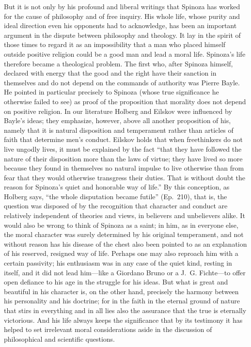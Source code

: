 \documentclass[12pt]{book}
\newcommand{\opage}[1]{\marginnote{\footnotesize\textit{[#1]}}}
\begin{document}
But it is not only by his profound and liberal writings that Spinoza has worked for
the cause of philosophy and of free inquiry. His whole life, whose purity and ideal
direction even his opponents had to acknowledge, has been an important argument in
the dispute between philosophy and theology. It lay in the spirit of those times to
regard it as an impossibility that a man who placed himself outside positive religion
could be a good man and lead a moral life. Spinoza's life therefore became a
theological problem. The first who, after Spinoza himself, declared with energy that
the good and the right have their sanction in themselves and do not depend on the
commands of authority was Pierre Bayle. He pointed in particular precisely to
\opage{41}Spinoza (whose true significance he otherwise failed to see) as proof of the
proposition that morality does not depend on positive religion. In our literature
Holberg and Eilskov were influenced by Bayle's ideas; they emphasize, however, above
all another proposition of his, namely that it is natural disposition and temperament
rather than articles of faith that determine men's conduct. Eilskov holds that when
freethinkers do not live ungodly lives, it must be explained by the fact ``that they
have followed the nature of their disposition more than the laws of virtue; they have
lived so more because they found in themselves no natural impulse to live otherwise
than from fear that they would otherwise transgress their duties. That is without
doubt the reason for Spinoza's quiet and honorable way of life.'' By this conception,
as Holberg says, ``the whole disputation became futile'' (Ep.~210), that is, the
question was disposed of by the recognition that character and conduct are relatively
independent of theories and views, in believers and unbelievers alike. It would also
be wrong to think of Spinoza as a saint; in him, as in everyone else, the moral
character was surely determined by his original temperament, and not without reason
has his disease of the chest also been pointed to as an explanation of his reserved,
resigned way of life. Perhaps one may also reproach him with a certain passivity; his
enthusiasm was in any case of the quiet kind, resting in itself, and it did not lead
him---like a Giordano Bruno or a J.~G. Fichte---to offer open defiance to his age in
the struggle for his ideas. But what is great and beautiful in his character is, on
the other \opage{42}hand, precisely the harmony between his personality and his
doctrine; for in the faith in the eternal ground of nature that stirs in everything and
in all lies also the assurance that the true is eternally victorious. And his life
always keeps the significance that by its testimony it has helped to set irrelevant
moral considerations aside in the discussion of philosophical and scientific questions.
\end{document}
